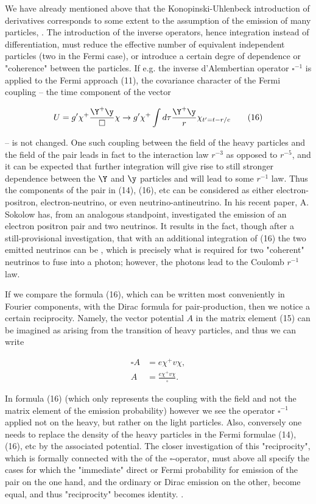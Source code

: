 \documentclass{article}
\newcommand{\nequ}[2]{
\begin{align*}
#1
\tag{#2}
\end{align*}
}
\begin{document}
We have already mentioned above that the Konopinski-Uhlenbeck introduction of derivatives corresponds to some extent to the assumption of the emission of many particles, . The introduction of the inverse operators, hence  integration instead of differentiation, must reduce the effective number of equivalent independent particles (two in the Fermi case), or introduce a certain degre of dependence or "coherence" between the particles. If e.g. the inverse d'Alembertian operator $\square^{-1}$ is applied to the Fermi approach (11), the covariance character of the Fermi coupling -- the time component of the vector
\nequ{
U = g'\chi^+ \frac{\Y^+\y}{\square}\chi \to g'\chi^+\int{d\tau}\frac{\Y^+\y}{r}\chi_{t' = t - r/c}
}{16}
-- is not changed. One such coupling between the field of the heavy particles and the field of the pair leads in fact to the interaction law $r^{-3}$ as opposed to $r^{-5}$, and it can be expected that further integration will give rise to still stronger dependence between the $\Y$ and $\y$ particles and will lead to some $r^{-1}$ law. Thus the components of the pair in (14), (16), etc can be considered as either electron-positron, electron-neutrino, or even neutrino-antineutrino. In his recent paper, A. Sokolow has, from an analogous standpoint, investigated the emission of an electron positron pair and two neutrinos. It results in the fact, though after a still-provisional investigation, that with an additional integration of (16) the two emitted neutrinos can be , which is precisely what is required for two "coherent" neutrinos to fuse into a photon; however, the photons lead to the Coulomb $r^{-1}$ law.

If we compare the formula (16), which can be written most conveniently in Fourier components, with the Dirac formula for pair-production, then we notice a certain reciprocity. Namely, the vector potential $A$ in the matrix element (15) can be imagined as arising from the transition of heavy particles, and thus we can write
\nequ{
\square A &= e\chi^+ v \chi,\\
A &= \frac{e\chi^+ v \chi}{\square}.
}{17}
In formula (16) (which only represents the coupling with the field and not the matrix element of the emission probability) however we see the operator $\square^{-1}$ applied not on the heavy, but rather on the light particles. Also, conversely one needs to replace the density of the heavy particles in the Fermi formulae (14), (16), etc by the associated potential. The closer investigation of this "reciprocity", which is formally connected with the  of the $\square$-operator, must above all specify the cases for which the "immediate" direct or Fermi probability for emission of the pair on the one hand, and the ordinary or Dirac emission on the other, become equal, and thus "reciprocity" becomes identity. .
\end{document}
